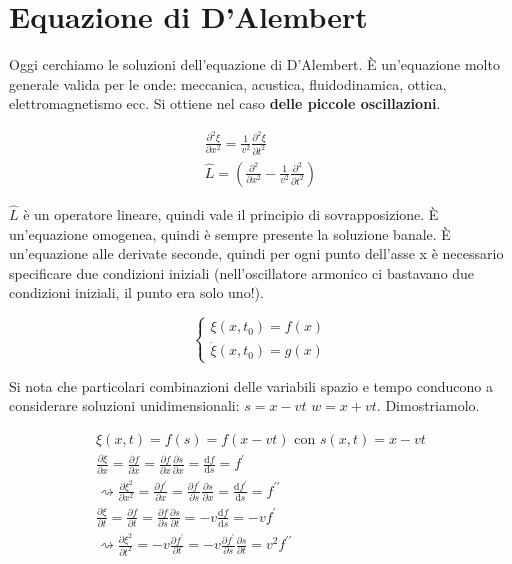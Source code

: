 \section{Equazione di D'Alembert}

Oggi cerchiamo le soluzioni dell'equazione di D'Alembert. È un'equazione molto generale valida per le onde: meccanica, acustica, fluidodinamica, ottica, elettromagnetismo ecc. Si ottiene nel caso \textbf{delle piccole oscillazioni}.

\begin{gather*}
	\frac{\partial ^{2} \xi }{\partial x^{2} } = \frac{1}{v^{2} }\frac{\partial ^{2} \xi }{\partial t ^{2} }\\
	\hat{L} = \left(\frac{\partial ^{2} }{\partial x^{2} } - \frac{1}{v^{2} }\frac{\partial ^{2} }{\partial t ^{2} }\right) 
\end{gather*}

\(\hat{L} \) è un operatore lineare, quindi vale il principio di sovrapposizione. È un'equazione omogenea, quindi è sempre presente la soluzione banale. È un'equazione alle derivate seconde, quindi per ogni punto dell'asse x è necessario specificare due condizioni iniziali (nell'oscillatore armonico ci bastavano due condizioni iniziali, il punto era solo uno!).

\[
	\begin{cases}
		\xi (x, t_0) = f(x)\\
		\dot{\xi } (x, t_0) = g(x) 
	\end{cases}	
\]

Si nota che particolari combinazioni delle variabili spazio e tempo conducono a considerare soluzioni unidimensionali: \(s=x-vt\) \(w=x+vt\). Dimostriamolo.

\begin{gather*}
	\xi (x,t) = f(s) = f(x-vt) \text{ con } s(x,t)=x-vt\\
	\frac{\partial \xi }{\partial x} = \frac{\partial f}{\partial x} = \frac{\partial f}{\partial x} \frac{\partial s}{\partial x} = \frac{\mathrm{d}f}{\mathrm{d}s} = f^{\prime} \\
	\rightsquigarrow \frac{\partial \xi ^{2} }{\partial x^{2} } = \frac{\partial f^{\prime} }{\partial x} = \frac{\partial f^{\prime} }{\partial s} \frac{\partial s}{\partial x} = \frac{\mathrm{d}f^{\prime} }{\mathrm{d}s} = f^{\prime\prime} \\
	\frac{\partial \xi }{\partial t} = \frac{\partial f}{\partial t} = \frac{\partial f}{\partial s} \frac{\partial s}{\partial t} = -v \frac{\mathrm{d}f}{\mathrm{d}s} = - v f^{\prime} \\
	\rightsquigarrow \frac{\partial \xi ^{2} }{\partial t^{2} } = -v \frac{\partial f^{\prime} }{\partial t}  = - v \frac{\partial f^{\prime} }{\partial s} \frac{\partial s}{\partial t} = v ^{2} f^{\prime\prime} 
\end{gather*}

